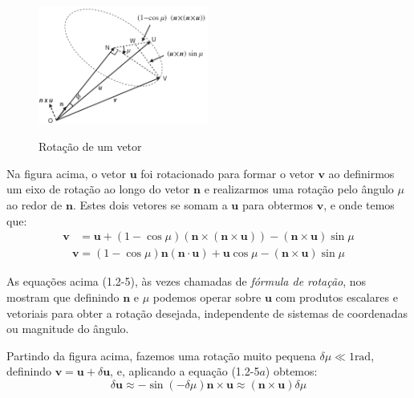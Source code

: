 \begin{figure}[h]
    \centering
    \includegraphics[width=0.5\textwidth, keepaspectratio]{figuras/figure1.2-1.png}\label{fig1.2-1}
    \caption{Rotação de um vetor}\label{fig:rotacao-de-um-vetor}
\end{figure}

Na figura acima, o vetor \(\mathbf{u}\) foi rotacionado para formar o vetor \(\mathbf{v}\) ao definirmos um eixo de rotação ao longo do vetor \(\mathbf{n}\) e realizarmos uma rotação pelo ângulo \(\mu\) ao redor de \(\mathbf{n}\). Estes dois vetores se somam a \(\mathbf{u}\) para obtermos \(\mathbf{v}\), e onde temos que:
    \begin{align*}
     \mathbf{v} &= \mathbf{u} + \left(1 - {\cos{\mu}}\right) \left(\mathbf{n}\!\times\!\left(\mathbf{n}\!\times\!\mathbf{u}\right)\right) - \left(\mathbf{n}\!\times\!\mathbf{u}\right){\sin{\mu}} \tag{1.2-5a}
    \end{align*}
    \begin{align*}
     \mathbf{v} = \left(1 - {\cos{\mu}}\right) \mathbf{n}\!\left(\mathbf{n}\cdot\mathbf{u}\right) + \mathbf{u}{\cos{\mu}} - \left(\mathbf{n}\!\times\!\mathbf{u}\right){\sin{\mu}} \tag{1.2-5b}
    \end{align*}

    As equações acima (1.2-5), às vezes chamadas de \textit{fórmula de rotação}, nos mostram que definindo \(\mathbf{n}\) e \(\mu\) podemos operar sobre \(\mathbf{u}\) com produtos escalares e vetoriais para obter a rotação desejada, independente de sistemas de coordenadas ou magnitude do ângulo.

    Partindo da figura acima, fazemos uma rotação muito pequena \(\delta\mu \ll 1 \text{rad}\), definindo \(\mathbf{v} = \mathbf{u} + \delta \mathbf{u}\), e, aplicando a equação (1.2-5\(a\)) obtemos:
\begin{equation*}
    \delta \mathbf{u} \approx -\!\sin(-\delta\mu)\mathbf{n}\!\times\!\mathbf{u} \approx (\mathbf{n}\!\times\!\mathbf{u})\delta\mu
\end{equation*}

